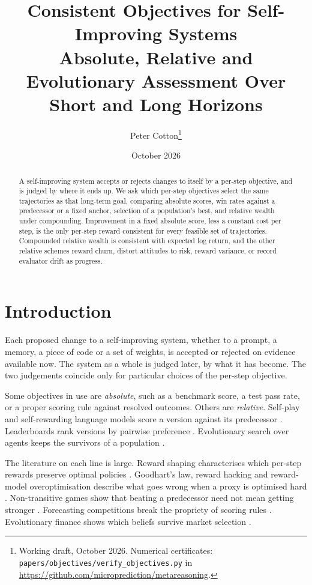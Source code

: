 \documentclass[11pt]{article}
\title{Consistent Objectives for Self-Improving Systems \\[4pt]
\large Absolute, Relative and Evolutionary Assessment Over Short and Long Horizons}
\author{Peter Cotton\thanks{Working draft, October 2026. Numerical certificates:
\texttt{papers/objectives/verify\_objectives.py} in
\url{https://github.com/microprediction/metareasoning}.}}
\date{October 2026}
\theoremstyle{definition}
\theoremstyle{remark}
\begin{document}
\maketitle

\begin{abstract}
A self-improving system accepts or rejects changes to itself by a per-step objective, and is
judged by where it ends up. We ask which per-step objectives select the same trajectories as
that long-term goal, comparing absolute scores, win rates against a predecessor or a fixed
anchor, selection of a population's best, and relative wealth under compounding. Improvement
in a fixed absolute score, less a constant cost per step, is the only per-step reward
consistent for every feasible set of trajectories. Compounded relative wealth is consistent
with expected log return, and the other relative schemes reward churn, distort attitudes to
risk, reward variance, or record evaluator drift as progress.
\end{abstract}

\section{Introduction}

Each proposed change to a self-improving system, whether to a prompt, a memory, a piece of
code or a set of weights, is accepted or rejected on evidence available now.
The system as a whole is judged later, by what it has become. The two judgements coincide only
for particular choices of the per-step objective.

Some objectives in use are \emph{absolute}, such as a benchmark score, a test pass rate, or
a proper scoring rule against resolved outcomes. Others are \emph{relative}. Self-play and
self-rewarding language models score a version against its predecessor
\citep{yuan2024selfrewarding}. Leaderboards rank versions by pairwise preference
\citep{chiang2024arena}. Evolutionary search over agents keeps the survivors of a population
\citep{zhang2025dgm,iacob2026redqueen}.

The literature on each line is large. Reward shaping characterises which per-step rewards
preserve optimal policies \citep{ng1999shaping}. Goodhart's law, reward hacking and reward-model
overoptimisation describe what goes wrong when a proxy is optimised hard
\citep{manheim2018goodhart,skalse2022hacking,gao2022overoptimization,karwowski2023goodhart}.
Non-transitive games show that beating a predecessor need not mean getting stronger
\citep{balduzzi2019openended,czarnecki2020spinning}. Forecasting competitions break the
propriety of scoring rules \citep{lichtendahl2007competition,witkowski2021competitions}.
Evolutionary finance shows which beliefs survive market selection
\citep{blume1992evolution,sandroni2000markets,blume2006smart}.
\end{document}
